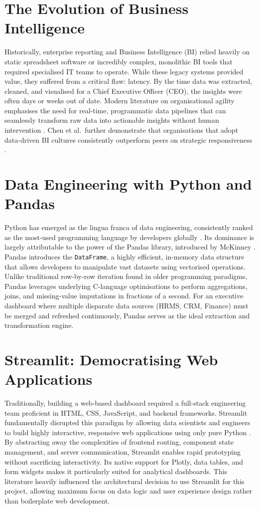 \documentclass{book}
\begin{document}
\section{The Evolution of Business Intelligence}
Historically, enterprise reporting and Business Intelligence (BI) relied heavily on static spreadsheet software or incredibly complex, monolithic BI tools that required specialised IT teams to operate. While these legacy systems provided value, they suffered from a critical flaw: latency. By the time data was extracted, cleaned, and visualised for a Chief Executive Officer (CEO), the insights were often days or weeks out of date. Modern literature on organisational agility emphasises the need for real-time, programmatic data pipelines that can seamlessly transform raw data into actionable insights without human intervention \cite{mckinsey_agile_2020}. Chen et al.\ further demonstrate that organisations that adopt data-driven BI cultures consistently outperform peers on strategic responsiveness \cite{chen2012business}.

\section{Data Engineering with Python and Pandas}
Python has emerged as the lingua franca of data engineering, consistently ranked as the most-used programming language by developers globally \cite{python_popularity_2023}. Its dominance is largely attributable to the power of the Pandas library, introduced by McKinney \cite{mckinney2010data}. Pandas introduces the \texttt{DataFrame}, a highly efficient, in-memory data structure that allows developers to manipulate vast datasets using vectorised operations. Unlike traditional row-by-row iteration found in older programming paradigms, Pandas leverages underlying C-language optimisations to perform aggregations, joins, and missing-value imputations in fractions of a second. For an executive dashboard where multiple disparate data sources (HRMS, CRM, Finance) must be merged and refreshed continuously, Pandas serves as the ideal extraction and transformation engine.

\section{Streamlit: Democratising Web Applications}
Traditionally, building a web-based dashboard required a full-stack engineering team proficient in HTML, CSS, JavaScript, and backend frameworks. Streamlit fundamentally disrupted this paradigm by allowing data scientists and engineers to build highly interactive, responsive web applications using only pure Python \cite{streamlit_docs}. By abstracting away the complexities of frontend routing, component state management, and server communication, Streamlit enables rapid prototyping without sacrificing interactivity. Its native support for Plotly, data tables, and form widgets makes it particularly suited for analytical dashboards. This literature heavily influenced the architectural decision to use Streamlit for this project, allowing maximum focus on data logic and user experience design rather than boilerplate web development.
\end{document}

